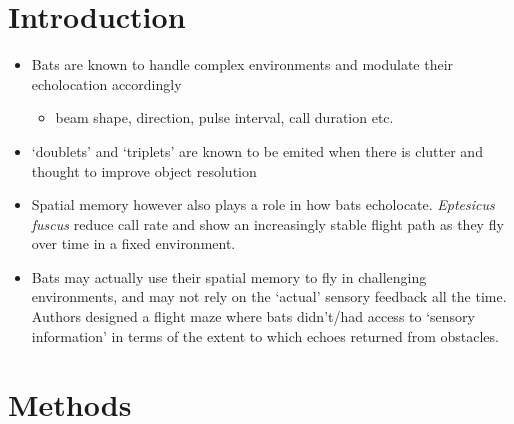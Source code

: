 \documentclass[
]{book}
\providecommand{\tightlist}{%
  \setlength{\itemsep}{0pt}\setlength{\parskip}{0pt}}
\begin{document}
\hypertarget{introduction}{%
\section{Introduction}\label{introduction}}

\begin{itemize}
\tightlist
\item
  Bats are known to handle complex environments and modulate their echolocation accordingly

  \begin{itemize}
  \tightlist
  \item
    beam shape, direction, pulse interval, call duration etc.
  \end{itemize}
\item
  `doublets' and `triplets' are known to be emited when there is clutter and thought to improve object resolution
\item
  Spatial memory however also plays a role in how bats echolocate. \emph{Eptesicus fuscus} reduce call rate and show an increasingly stable flight path as they fly over time in a fixed environment.
\item
  Bats may actually use their spatial memory to fly in challenging environments, and may not rely on the `actual' sensory feedback all the time. Authors designed a flight maze where bats didn't/had access to `sensory information' in terms of the extent to which echoes returned from obstacles.
\end{itemize}

\hypertarget{methods}{%
\section{Methods}\label{methods}}
\end{document}
